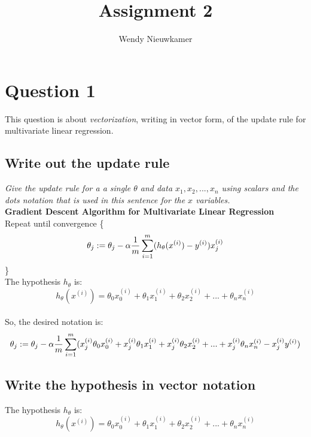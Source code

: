 \documentclass{article}
\title {Assignment 2}
\date{}
\author{Wendy Nieuwkamer}
\begin{document}
\maketitle

\section{Question 1}
This question is about \textit{vectorization}, writing in vector form, of the update rule for multivariate linear regression.

\subsection{Write out the update rule}
\textit{Give the update rule for a a single $\theta$ and data $x_1, x_2, ..., x_n$ using scalars and the dots notation that is used
in this sentence for the $x$ variables.}\\

	\textbf{Gradient Descent Algorithm for Multivariate Linear Regression}\\
	
	Repeat until convergence \{
	\begin{equation*}
	\theta _j := \theta _j - \alpha \frac{1}{m} \sum\limits_{i=1}^m (h _{\theta} (x ^{(i)}) - y ^{(i)})x_j^{(i)} \\
	\end{equation*}
	\}\\
	
	The hypothesis $h_\theta$ is:
	\begin{equation*}
	h_\theta (x^{(i)}) = \theta_0 x_0^{(i)} + \theta_1 x_1^{(i)}+ \theta_2 x_2^{(i)}+ ... + \theta_n x_n^{(i)}
	\end{equation*}\\

	So, the desired notation is:
	\begin{equation*}
	\theta_j  := \theta_j  - \alpha \frac{1}{m} \sum\limits_{i=1}^m ( x_j^{(i)}\theta_0 x_0^{(i)} + x_j^{(i)}\theta_1 x_1^{(i)}+ x_j^{(i)}\theta_2 x_2^{(i)}+ ... 
			+ x_j^{(i)}\theta_n x_n^{(i)} -x_j^{(i)} y ^{(i)}) \\
	\end{equation*}

\subsection{Write the hypothesis in vector notation}
	
	The hypothesis $h_\theta$ is:
	\begin{equation*}
	h_\theta (x^{(i)}) = \theta_0 x_0^{(i)} + \theta_1 x_1^{(i)}+ \theta_2 x_2^{(i)}+ ... + \theta_n x_n^{(i)}
	\end{equation*}\\
\end{document}
